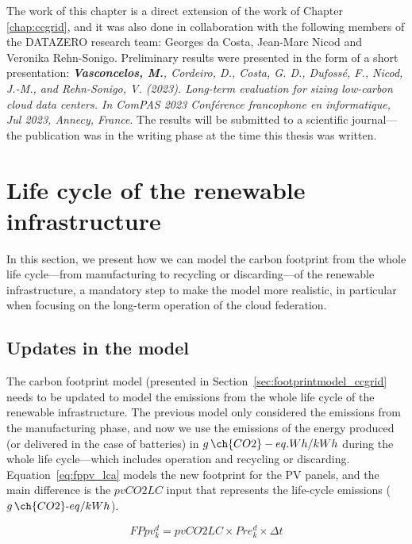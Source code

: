 The work of this chapter is a direct extension of the work of Chapter \ref{chap:ccgrid}, and it was also done in collaboration with the following members of the DATAZERO\cite{datazero} research team: Georges da Costa, Jean-Marc Nicod and Veronika Rehn-Sonigo. Preliminary results were presented in the form of a short presentation:   \textit{\textbf{Vasconcelos, M.}, Cordeiro, D., Costa, G. D., Dufossé, F., Nicod, J.-M., and Rehn-Sonigo, V. (2023). Long-term evaluation for sizing low-carbon cloud data centers. In ComPAS 2023 Conférence francophone en informatique, Jul 2023, Annecy, France}. The results will be submitted to a scientific journal---the publication was in the writing phase at the time this thesis was written. 




\section{Life cycle of the renewable infrastructure}
\label{sec:lifecicle}

In this section, we present how we can model the carbon footprint from the whole life cycle---from manufacturing to recycling or discarding---of the renewable infrastructure,  a mandatory step to make the model more realistic, in particular when focusing on the long-term operation of the cloud federation.


\subsection{Updates in the model}

The carbon footprint model (presented in Section~\ref{sec:footprintmodel_ccgrid} needs to be updated to model the  emissions from the whole life cycle of the renewable infrastructure.  The previous model only considered the  emissions from the manufacturing phase, and now we use the emissions of the energy produced (or delivered in the case of batteries) in $g\,\ch{CO2}-eq.Wh/kWh$ during the whole life cycle---which includes operation and recycling or discarding. Equation~\eqref{eq:fppv_lca} models the new footprint for the PV panels, and the main difference is the $pvCO2LC$ input that represents the life-cycle emissions ($g\,\ch{CO2}\text{-}eq/kWh$).


\begin{equation} \label{eq:fppv_lca}
   FPpv^d_k =  pvCO2LC \times Pre_k^d \times \Delta t
\end{equation}

